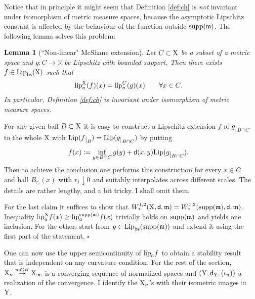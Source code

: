 \documentclass[11pt]{article}
\numberwithin{equation}{section}
\newtheorem{lemma}[theorem]{Lemma}
\newenvironment{idea}{\removelastskip\par\medskip   %
\noindent{\em Idea of the proof} \rm}{\penalty-20\null\hfill$\square$\par\medbreak}
\newcommand{\R}{\mathbb{R}}
\newcommand{\restr}[1]{\lower3pt\hbox{$|_{#1}$}}
\newcommand{\X}{{\rm X}}
\newcommand{\Y}{{\rm Y}}
\newcommand{\sfd}{{\sf d}}
\newcommand{\mm}{{\mathfrak m}}
\newcommand{\Lip}{{\rm Lip}}
\newcommand{\lipa}{{\rm lip}_a}
\newcommand{\bs}{{\rm bs}}
\newcommand{\supp}{{\rm supp}}
\begin{document}
Notice that in principle it might seem that Definition \ref{def:ch} is \emph{not} invariant under isomorphism of metric measure spaces, because the asymptotic Lipschitz constant is affected by the behaviour of the function outside $\supp(\mm)$. The following lemma solves this problem:
\begin{lemma}[``Non-linear" McShane extension]\label{le:locmcsh}
Let $C\subset\X$ be a subset of a metric space and $g:C\to\R$ be Lipschitz with bounded support. Then there exists $f\in\Lip_\bs(\X)$  such that
\[
\lipa^\X(f)(x)=\lipa^C(g)(x)\qquad\forall x\in C.
\] 
In particular, Definition \ref{def:ch} is invariant under isomorphism of metric measure spaces.
\end{lemma}
\begin{idea}
For any given ball $B\subset\X$ it is easy to construct a Lipschitz extension $f$ of $g\restr{B\cap C}$ to the whole $\X$ with $\Lip(f\restr B)=\Lip(g\restr{B\cap C})$ by putting 
\[
f(x):=\inf_{y\in B\cap C}g(y)+\sfd(x,y)\Lip(g\restr{B\cap C}). 
\]Then to achieve the conclusion one  performs this construction for every $x\in C$ and ball $B_{r_i}(x)$ with $r_i\downarrow0$ and suitably interpolates across different scales. The details are rather lengthy, and a bit tricky. I shall omit them.

For the last claim it suffices to show that $W^{1,2}_*(\X,\sfd,\mm)=W^{1,2}_*(\supp(\mm),\sfd,\mm)$. Inequality $\lipa^\X f(x)\geq \lipa^{\supp(\mm)} f(x)$ trivially holds on $\supp(\mm)$ and yields one inclusion. For the other, start from $g\in\Lip_\bs(\supp(\mm))$ and extend it using the first part of the statement.
\end{idea}
One can now use the upper semicontinuity of $\lipa f$ to obtain a stability result that is independent on any curvature condition. For the rest of the section, $\X_n\stackrel{mGH}\to\X_\infty$ is a converging sequence of normalized spaces and $(\Y,\sfd_\Y,(\iota_n))$ a realization of the convergence. I identify the $\X_n$'s with their isometric images in $\Y$.
\end{document}
